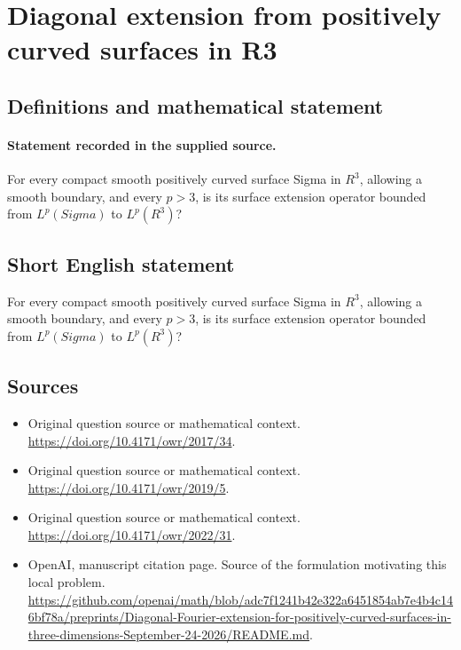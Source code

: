 \documentclass[11pt]{article}
\begin{document}
\section*{Diagonal extension from positively curved surfaces in R3}\label{30007425}
\subsection{Definitions and mathematical statement}
\paragraph{Statement recorded in the supplied source.}
For every compact smooth positively curved surface Sigma in $R^3$, allowing a smooth boundary, and every $p>3$, is its surface extension operator bounded from $L^p(Sigma)$ to $L^p(R^3)$?
\subsection{Short English statement}
For every compact smooth positively curved surface Sigma in $R^3$, allowing a smooth boundary, and every $p>3$, is its surface extension operator bounded from $L^p(Sigma)$ to $L^p(R^3)$?
\subsection{Sources}
\begin{itemize}
\item[S1] Original question source or mathematical context.
\url{https://doi.org/10.4171/owr/2017/34}.
\item[S2] Original question source or mathematical context.
\url{https://doi.org/10.4171/owr/2019/5}.
\item[S3] Original question source or mathematical context.
\url{https://doi.org/10.4171/owr/2022/31}.
\item[S4] OpenAI, manuscript citation page. Source of the formulation motivating this local problem.
\url{https://github.com/openai/math/blob/adc7f1241b42e322a6451854ab7e4b4c146bf78a/preprints/Diagonal-Fourier-extension-for-positively-curved-surfaces-in-three-dimensions-September-24-2026/README.md}.
\end{itemize}
\end{document}
